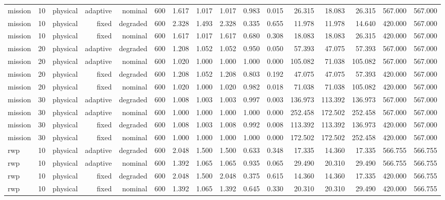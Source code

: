 \begin{tabular}{lrrrrrrrrrrrrrrr}
mission & 10 & physical & adaptive & nominal & 600 & 1.617 & 1.017 & 1.017 & 0.983 & 0.015 & 26.315 & 18.083 & 26.315 & 567.000 & 567.000 \\
mission & 10 & physical & fixed & degraded & 600 & 2.328 & 1.493 & 2.328 & 0.335 & 0.655 & 11.978 & 11.978 & 14.640 & 420.000 & 567.000 \\
mission & 10 & physical & fixed & nominal & 600 & 1.617 & 1.017 & 1.617 & 0.680 & 0.308 & 18.083 & 18.083 & 26.315 & 420.000 & 567.000 \\
mission & 20 & physical & adaptive & degraded & 600 & 1.208 & 1.052 & 1.052 & 0.950 & 0.050 & 57.393 & 47.075 & 57.393 & 567.000 & 567.000 \\
mission & 20 & physical & adaptive & nominal & 600 & 1.020 & 1.000 & 1.000 & 1.000 & 0.000 & 105.082 & 71.038 & 105.082 & 567.000 & 567.000 \\
mission & 20 & physical & fixed & degraded & 600 & 1.208 & 1.052 & 1.208 & 0.803 & 0.192 & 47.075 & 47.075 & 57.393 & 420.000 & 567.000 \\
mission & 20 & physical & fixed & nominal & 600 & 1.020 & 1.000 & 1.020 & 0.982 & 0.018 & 71.038 & 71.038 & 105.082 & 420.000 & 567.000 \\
mission & 30 & physical & adaptive & degraded & 600 & 1.008 & 1.003 & 1.003 & 0.997 & 0.003 & 136.973 & 113.392 & 136.973 & 567.000 & 567.000 \\
mission & 30 & physical & adaptive & nominal & 600 & 1.000 & 1.000 & 1.000 & 1.000 & 0.000 & 252.458 & 172.502 & 252.458 & 567.000 & 567.000 \\
mission & 30 & physical & fixed & degraded & 600 & 1.008 & 1.003 & 1.008 & 0.992 & 0.008 & 113.392 & 113.392 & 136.973 & 420.000 & 567.000 \\
mission & 30 & physical & fixed & nominal & 600 & 1.000 & 1.000 & 1.000 & 1.000 & 0.000 & 172.502 & 172.502 & 252.458 & 420.000 & 567.000 \\
rwp & 10 & physical & adaptive & degraded & 600 & 2.048 & 1.500 & 1.500 & 0.633 & 0.348 & 17.335 & 14.360 & 17.335 & 566.755 & 566.755 \\
rwp & 10 & physical & adaptive & nominal & 600 & 1.392 & 1.065 & 1.065 & 0.935 & 0.065 & 29.490 & 20.310 & 29.490 & 566.755 & 566.755 \\
rwp & 10 & physical & fixed & degraded & 600 & 2.048 & 1.500 & 2.048 & 0.375 & 0.615 & 14.360 & 14.360 & 17.335 & 420.000 & 566.755 \\
rwp & 10 & physical & fixed & nominal & 600 & 1.392 & 1.065 & 1.392 & 0.645 & 0.330 & 20.310 & 20.310 & 29.490 & 420.000 & 566.755 \\

\end{tabular}
